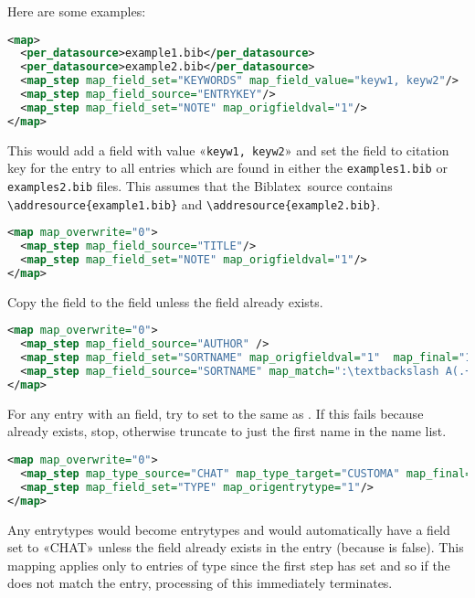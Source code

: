 \documentclass{ltxdockit}
\newcommand*{\biblatex}{Biblatex\xspace}
\begin{document}
\noindent Here are some examples:

\begin{lstlisting}[language=xml,escapechar=+,mathescape=true]
<map>
  <per_datasource>example1.bib</per_datasource>
  <per_datasource>example2.bib</per_datasource>
  <map_step map_field_set="KEYWORDS" map_field_value="keyw1, keyw2"/>
  <map_step map_field_source="ENTRYKEY"/>
  <map_step map_field_set="NOTE" map_origfieldval="1"/>
</map>
\end{lstlisting}

\noindent This would add a  field with value «\verb+keyw1, keyw2+»
and set the  field to citation key for the entry
to all entries which are found in either the
\verb+examples1.bib+ or \verb+examples2.bib+ files. This assumes that the
\biblatex\ source contains \verb+\addresource{example1.bib}+ and
\verb+\addresource{example2.bib}+.

\begin{lstlisting}[language=xml,escapechar=+,mathescape=true]
<map map_overwrite="0">
  <map_step map_field_source="TITLE"/>
  <map_step map_field_set="NOTE" map_origfieldval="1"/>
</map>
\end{lstlisting}

\noindent Copy the  field to the  field unless the
 field already exists.

\begin{lstlisting}[language=xml,escapechar=:,mathescape=true]
<map map_overwrite="0">
  <map_step map_field_source="AUTHOR" />
  <map_step map_field_set="SORTNAME" map_origfieldval="1"  map_final="1"/>
  <map_step map_field_source="SORTNAME" map_match=":\textbackslash A(.+?)\textbackslash s+and.\ast" map\_replace="\$1:"/>
</map>
\end{lstlisting}

\noindent For any entry with an  field, try to set
 to the same as . If this fails because
 already exists, stop, otherwise truncate
 to just the first name in the name list.

\begin{lstlisting}[language=xml,escapechar=+,mathescape=true]
<map map_overwrite="0">
  <map_step map_type_source="CHAT" map_type_target="CUSTOMA" map_final="1"/>
  <map_step map_field_set="TYPE" map_origentrytype="1"/>
</map>
\end{lstlisting}

\noindent Any  entrytypes would become  entrytypes and 
would automatically have a  field set to 
«CHAT» unless the  field already exists in the entry (because
 is false). This mapping applies only to entries of type
 since the first step has  set and so if the
 does not match the entry, processing of this
 immediately terminates.
\end{document}
